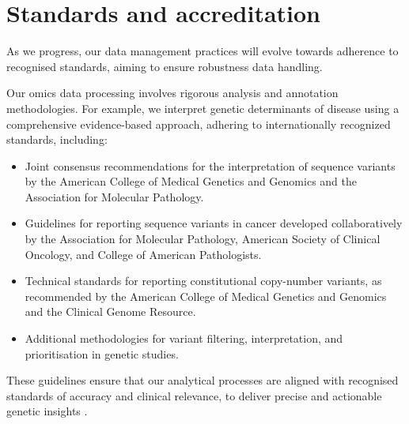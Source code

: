 \section{Standards and accreditation}

As we progress, our data management practices will evolve towards adherence to recognised standards, aiming to ensure robustness data handling. 

Our omics data processing involves rigorous analysis and annotation methodologies. For example, we interpret genetic determinants of disease using a comprehensive evidence-based approach, adhering to internationally recognized standards, including:

\begin{itemize}
  \item Joint consensus recommendations for the interpretation of sequence variants by the American College of Medical Genetics and Genomics and the Association for Molecular Pathology.
  \item Guidelines for reporting sequence variants in cancer developed collaboratively by the Association for Molecular Pathology, American Society of Clinical Oncology, and College of American Pathologists.
  \item Technical standards for reporting constitutional copy-number variants, as recommended by the American College of Medical Genetics and Genomics and the Clinical Genome Resource.
  \item Additional methodologies for variant filtering, interpretation, and prioritisation in genetic studies.
\end{itemize}
These guidelines ensure that our analytical processes are aligned with recognised standards of accuracy and clinical relevance, to deliver precise and actionable genetic insights
\citep{richards2015standards,
li2017standards,
riggs2020technical,
li2017standards,
pedersen2021effective,
li2017intervar,
xavier2019tapes}.

